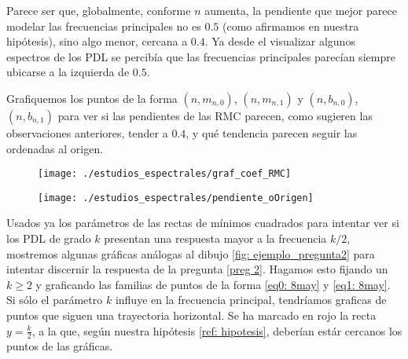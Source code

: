 Parece ser que, 
globalmente,
conforme $n$ aumenta, la 
pendiente que mejor parece modelar las
frecuencias principales no es
$0.5$ (como afirmamos en nuestra hipótesis), 
sino algo menor, cercana a $0.4$. 
Ya desde el visualizar algunos espectros
de los PDL se percibía que las frecuencias principales
parecían siempre ubicarse a la izquierda de $0.5$.

Grafiquemos los puntos de la forma
$(n, m_{n,0})$, $(n, m_{n,1})$ y 
$(n, b_{n,0})$, $(n, b_{n,1})$ 
para ver si las pendientes de las RMC parecen, como
sugieren las observaciones anteriores, tender a $0.4$,
y qué tendencia parecen seguir las ordenadas al origen.
\begin{figure}[H]
	\centering
	\texttt{[image: ./estudios\_espectrales/graf\_coef\_RMC]} 
\end{figure}	

\begin{figure}[H]
	\centering
	\texttt{[image: ./estudios\_espectrales/pendiente\_oOrigen]} 
\end{figure}	


Usados ya los parámetros de las rectas
de mínimos cuadrados para
intentar ver si los PDL
de grado $k$ presentan una respuesta
mayor a la frecuencia $k/2$, 
mostremos algunas gráficas análogas
al dibujo \ref{fig: ejemplo_pregunta2} 
para intentar discernir la respuesta
de la pregunta 
\ref{preg 2}.
Hagamos esto 
fijando un $k \geq 2$ y 
graficando las familias de puntos de la forma
\eqref{eq0: 8may}
y \eqref{eq1: 8may}. Si sólo el parámetro $k$ 
influye en la frecuencia principal, tendríamos graficas
de puntos que siguen una trayectoria horizontal.
Se ha marcado en rojo la recta
$y = \frac{k}{2}$, a la que, según nuestra hipótesis
\ref{ref: hipotesis}, deberían estár cercanos los
puntos de las gráficas. 

